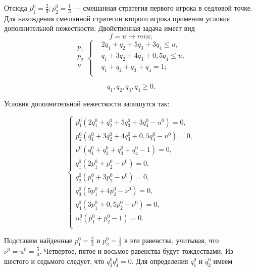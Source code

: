 Отсюда $p_1^0=\frac{2}{3}; p_2^0=\frac{1}{3}$ — смешанная стратегия первого игрока в седловой точке.  Для нахождения смешанной стратегии второго игрока применим условия  дополнительной нежесткости. Двойственная задача имеет вид
\begin{equation}
\label{equation_4_27}
    f=u \to min;
\end{equation}
\begin{equation}
\label{equation_4_28}
\begin{aligned}
p_1\\
p_2\\
\nu \\
\end{aligned}
\left\{
\begin{aligned}
&2q_1 + q_2 + 5q_3 + 3q_4 \leqslant u, \\
&q_1 + 3q_2 + 4q_3 + 0,5q_4 \leqslant u, \\
&q_1 + q_2 + q_3 + q_4 = 1; \\
\end{aligned}
\right.
\end{equation}

\begin{equation}
\label{equation_4_29}
    q_1, q_2, q_3, q_4 \geqslant 0.
\end{equation}

Условия дополнительной нежесткости запишутся так:

\begin{equation}
\label{equation_4_30}
\begin{cases}
p_1^0 (2q_1^0 + q_2^0 + 5q_3^0 + 3q_4^0 - u^0) = 0, \\
p_2^0 (q_1^0 + 3q_2^0 + 4q_3^0 + 0,5q_4^0 - u^0) = 0, \\
\nu^0 (q_1^0 + q_2^0 + q_3^0 + q_4^0 - 1) = 0,\\
q_1^0 (2p_1^0 + p_2^0 - \nu^0) = 0,\\
q_2^0 (p_1^0 + 3p_2^0 - \nu^0) = 0,\\
q_3^0 (5p_1^0 + 4p_2^0 - \nu^0) = 0,\\
q_4^0 (3p_1^0 + 0,5p_2^0 - \nu^0) = 0,\\
u_1^0 (p_1^0 + p_2^0 - 1) = 0.\\
\end{cases}
\end{equation}

Подставим найденные $p_1^0=\frac{2}{3}$ и $p_2^0=\frac{1}{3}$ в эти равенства, учитывая, что $\nu^0 = u^0 = \frac{5}{3}.$ Четвертое, пятое и восьмое равенства будут тождествами. Из шестого и седьмого следует, что $q_3^0  q_4^0 = 0.$ Для определения $q_1^0$ и $q_2^0$ имеем

